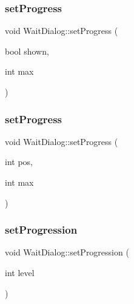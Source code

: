 \subsubsection{\texorpdfstring{setProgress}{setProgress}\hspace{0.1cm}{\footnotesize\ttfamily [1/2]}}
{\footnotesize\ttfamily void Wait\+Dialog\+::set\+Progress (\begin{DoxyParamCaption}\item[{bool}]{shown,  }\item[{int}]{max }\end{DoxyParamCaption})\hspace{0.3cm}{\ttfamily [slot]}}

\mbox{\label{class_wait_dialog_afaf2e714ddeff8f6bea99471f576f489}} 
\subsubsection{\texorpdfstring{setProgress}{setProgress}\hspace{0.1cm}{\footnotesize\ttfamily [2/2]}}
{\footnotesize\ttfamily void Wait\+Dialog\+::set\+Progress (\begin{DoxyParamCaption}\item[{int}]{pos,  }\item[{int}]{max }\end{DoxyParamCaption})\hspace{0.3cm}{\ttfamily [slot]}}

\mbox{\label{class_wait_dialog_aa159c59b6bc1b6388e7fefc2c77f5a9c}} 
\subsubsection{\texorpdfstring{setProgression}{setProgression}}
{\footnotesize\ttfamily void Wait\+Dialog\+::set\+Progression (\begin{DoxyParamCaption}\item[{int}]{level }\end{DoxyParamCaption})\hspace{0.3cm}{\ttfamily [slot]}}

\mbox{\label{class_wait_dialog_ad85c079019be4a00fb92c4c5bf9c809d}} 
